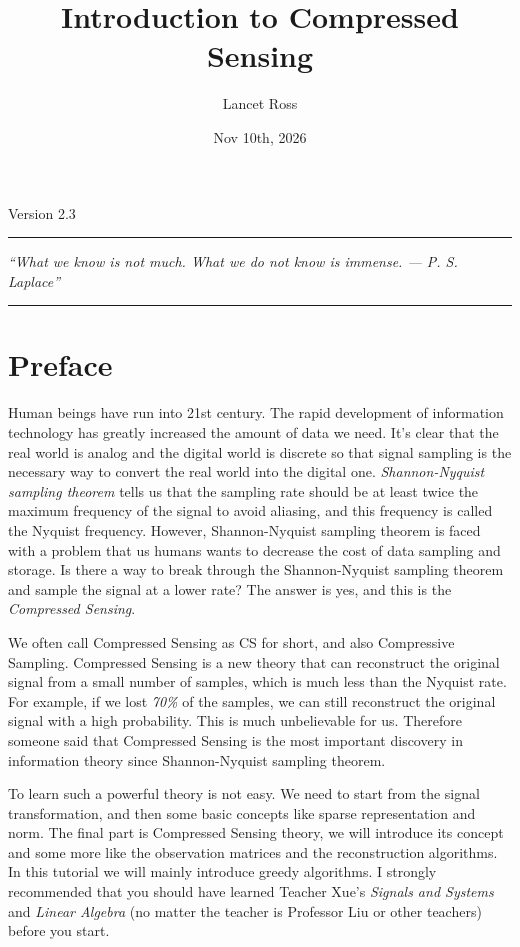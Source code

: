 \documentclass[10pt,a4paper,oneside,numbers=noenddot]{scrbook}
\title{Introduction to Compressed Sensing}
\author{Lancet Ross}
\date{Nov 10th, 2026}
\makeatletter
\newcommand*{\bookversion}{2.3}
\newcommand*{\bookquote}{``What we know is not much. What we do not know is immense. --- P. S. Laplace''}
\theoremstyle{ctplain}
\theoremstyle{ctresult}
\renewcommand*{\maketitle}{%
  \begin{titlepage}
    \hypersetup{pageanchor=false}
    \centering
    \null\vspace{5em}
    {\Huge\bfseries \@title\par}
    \vspace{1.5em}
    {\large Version \bookversion\par}
    \vspace{3em}
    \rule{\textwidth}{0.4pt}\par
    \vspace{1.2em}
    {\itshape \bookquote\par}
    \vspace{1.2em}
    \rule{\textwidth}{0.4pt}\par
    \vfill
    {\large \@author\par}
    \vspace{0.6em}
    {\large \@date\par}
    \vspace{2em}
  \end{titlepage}
}
\makeatother
\begin{document}
\maketitle

\frontmatter
\tableofcontents

\chapter*{Preface}
\linespread{1.55}\selectfont

Human beings have run into 21st century. The rapid development of information technology
has greatly increased the amount of data we need. It's clear that the real world is analog
and the digital world is discrete so that signal sampling is the necessary way to convert
the real world into the digital one. \emph{Shannon-Nyquist sampling theorem} tells us
that the sampling rate should be at least twice the maximum frequency of the signal to
avoid aliasing, and this frequency is called the Nyquist frequency. However,
Shannon-Nyquist sampling theorem is faced with a problem that us humans wants to decrease
the cost of data sampling and storage. Is there a way to break through the
Shannon-Nyquist sampling theorem and sample the signal at a lower rate? The answer is yes,
and this is the \emph{Compressed Sensing}.

We often call Compressed Sensing as CS for short, and also Compressive Sampling.
Compressed Sensing is a new theory that can reconstruct the original signal
from a small number of samples, which is much less than the Nyquist rate. For example, if
we lost \emph{70\%} of the samples, we can still reconstruct the original signal with a
high probability. This is much unbelievable for us. Therefore someone said that Compressed
Sensing is the most important discovery in information theory since Shannon-Nyquist
sampling theorem.

To learn such a powerful theory is not easy. We need to start from the signal
transformation, and then some basic concepts like sparse representation and norm. The
final part is Compressed Sensing theory, we will introduce its concept and some
more like the observation matrices and the reconstruction algorithms. In this tutorial
we will mainly introduce greedy algorithms. I strongly recommended that you should have learned Teacher
Xue's \emph{Signals and Systems} and \emph{Linear Algebra} (no matter the teacher is 
Professor Liu or other teachers) before you start. 
\end{document}
